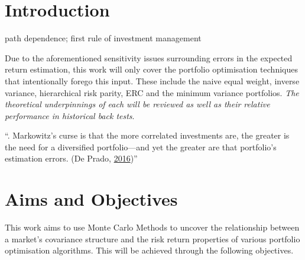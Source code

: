 \documentclass[11pt,preprint, authoryear]{elsarticle}
\numberwithin{equation}{section}
\numberwithin{figure}{section}
\numberwithin{table}{section}
\begin{document}

\headsep 35pt %




\hypertarget{introduction}{%
\section{\texorpdfstring{Introduction
\label{Introduction}}{Introduction }}\label{introduction}}

path dependence; first rule of investment management

Due to the aforementioned sensitivity issues surrounding errors in the
expected return estimation, this work will only cover the portfolio
optimisation techniques that intentionally forego this input. These
include the naive equal weight, inverse variance, hierarchical risk
parity, ERC and the minimum variance portfolios. \emph{The theoretical
underpinnings of each will be reviewed as well as their relative
performance in historical back tests}.

``. Markowitz's curse is that the more correlated investments are, the
greater is the need for a diversified portfolio---and yet the greater
are that portfolio's estimation errors. (De Prado,
\protect\hyperlink{ref-lopez}{2016})''

\hypertarget{aims-and-objectives}{%
\section{Aims and Objectives}\label{aims-and-objectives}}

This work aims to use Monte Carlo Methods to uncover the relationship
between a market's covariance structure and the risk return properties
of various portfolio optimisation algorithms. This will be achieved
through the following objectives.
\end{document}
